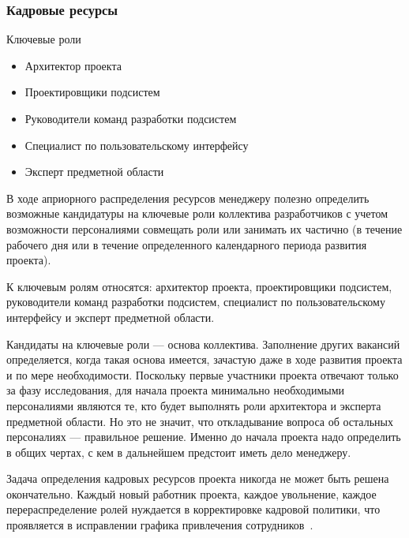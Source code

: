 \documentclass{../industrial-development}
\begin{document}
\begin{frame} \frametitle{Кадровые ресурсы}
    
    \begin{block}{Ключевые роли}
      \begin{itemize}
       \item Архитектор проекта
       \item Проектировщики подсистем
       \item Руководители команд разработки подсистем
       \item Специалист по пользовательскому интерфейсу
       \item Эксперт предметной области
      \end{itemize}
    \end{block}
\end{frame}

\lecturenotes

В ходе априорного распределения ресурсов менеджеру полезно определить возможные кандидатуры на ключевые роли коллектива разработчиков с учетом возможности персоналиями совмещать роли или занимать их частично (в течение рабочего дня или в течение определенного календарного периода развития проекта).

К ключевым ролям относятся: архитектор проекта, проектировщики подсистем, руководители команд разработки подсистем, специалист по пользовательскому интерфейсу и эксперт предметной области. 

Кандидаты на ключевые роли — основа коллектива. Заполнение других вакансий определяется, когда такая основа имеется, зачастую даже в ходе развития проекта и по мере необходимости. Поскольку первые участники проекта отвечают только за фазу исследования, для начала проекта минимально необходимыми персоналиями являются те, кто будет выполнять роли архитектора и эксперта предметной области. Но это не значит, что откладывание вопроса об остальных персоналиях — правильное решение. Именно до начала проекта надо определить в общих чертах, с кем в дальнейшем предстоит иметь дело менеджеру.

Задача определения кадровых ресурсов проекта никогда не может быть решена окончательно. Каждый новый работник проекта, каждое увольнение, каждое перераспределение ролей нуждается в корректировке кадровой политики, что проявляется в исправлении графика привлечения сотрудников~\cite[с.~42--46]{Skopin}.
\end{document}
